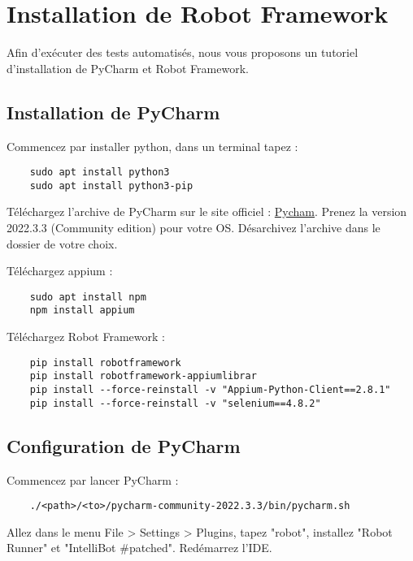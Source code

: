 \section{Installation de Robot Framework}

Afin d'exécuter des tests automatisés, nous vous proposons un tutoriel d'installation de PyCharm et Robot Framework.

\subsection{Installation de PyCharm}

Commencez par installer python, dans un terminal tapez : 
\vspace{-1.8\baselineskip} 
\begin{lstlisting}
    sudo apt install python3
    sudo apt install python3-pip
\end{lstlisting}

Téléchargez l'archive de PyCharm sur le site officiel : \href{https://www.jetbrains.com/fr-fr/pycharm/download/other.html}{Pycham}. Prenez la version 2022.3.3 (Community edition) pour votre OS. Désarchivez l'archive dans le dossier de votre choix.

Téléchargez appium :
\vspace{-1.8\baselineskip} 
\begin{lstlisting}
    sudo apt install npm
    npm install appium
\end{lstlisting}

Téléchargez Robot Framework :
\vspace{-1.8\baselineskip} 
\begin{lstlisting}
    pip install robotframework
    pip install robotframework-appiumlibrar
    pip install --force-reinstall -v "Appium-Python-Client==2.8.1"
    pip install --force-reinstall -v "selenium==4.8.2"
\end{lstlisting}

\subsection{Configuration de PyCharm}

Commencez par lancer PyCharm : 
\vspace{-1.8\baselineskip} 
\begin{lstlisting}
    ./<path>/<to>/pycharm-community-2022.3.3/bin/pycharm.sh
\end{lstlisting}

Allez dans le menu File > Settings > Plugins, tapez "robot", installez "Robot Runner" et "IntelliBot \#patched". Redémarrez l'IDE.